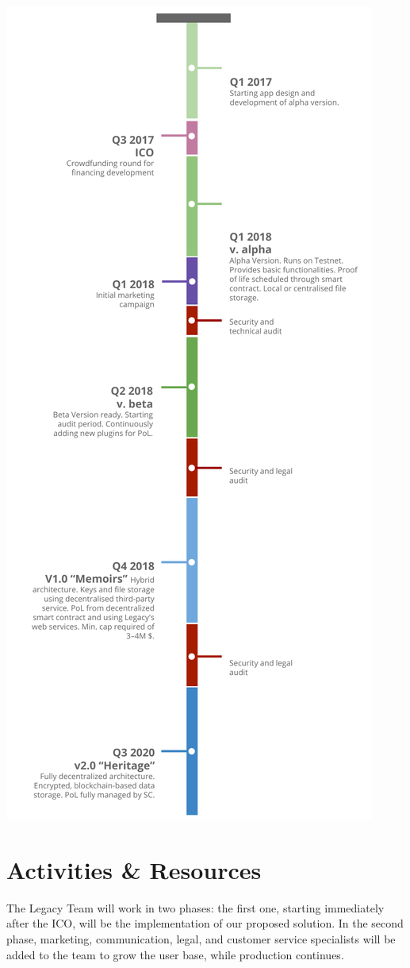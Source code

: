 \includegraphics[scale=0.6]{fig/roadmap_vertical.pdf}

\section{Activities \& Resources} %
\label{sec:activities_resources}
The Legacy Team will work in two phases: the first one, starting immediately after the ICO, will be the implementation of our proposed solution. In the second phase, marketing, communication, legal, and customer service specialists will be added to the team to grow the user base, while production continues.

